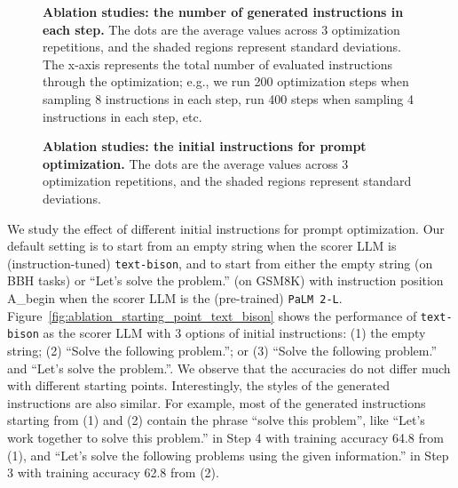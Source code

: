 \begin{figure}
\centering
{}
\hspace{.01\linewidth}
\caption{\textbf{Ablation studies: the number of generated instructions in each step.} 
The dots are the average values across 3 optimization repetitions, and the shaded regions represent standard deviations.
The x-axis represents the total number of evaluated instructions through the optimization; e.g., we run 200 optimization steps when sampling 8 instructions in each step, run 400 steps when sampling 4 instructions in each step, etc.}
\label{fig:ablation_num_ins_in_each_step}
\end{figure}

\begin{figure}[t]
\centering
{}
\hspace{.01\linewidth}
\caption{\textbf{Ablation studies: the initial instructions for prompt optimization.}
The dots are the average values across 3 optimization repetitions, and the shaded regions represent standard deviations.
}
\label{fig:ablation_starting_point}
\end{figure}

We study the effect of different initial instructions for prompt optimization.
Our default setting is to start from an empty string when the scorer LLM is (instruction-tuned) \texttt{text-bison}, and to start from either the empty string (on BBH tasks) or ``Let's solve the problem.'' (on GSM8K) with instruction position A\_begin when the scorer LLM is the (pre-trained) \texttt{PaLM 2-L}.
Figure~\ref{fig:ablation_starting_point_text_bison} shows the performance of \texttt{text-bison} as the scorer LLM with 3 options of initial instructions: (1) the empty string; (2) ``Solve the following problem.''; or (3) ``Solve the following problem.'' and ``Let's solve the problem.''. We observe that the accuracies do not differ much with different starting points.
Interestingly, the styles of the generated instructions are also similar. For example, most of the generated instructions starting from (1) and (2) contain the phrase ``solve this problem'', like ``Let's work together to solve this problem.'' in Step 4 with training accuracy 64.8 from (1), and ``Let's solve the following problems using the given information.'' in Step 3 with training accuracy 62.8 from (2).

